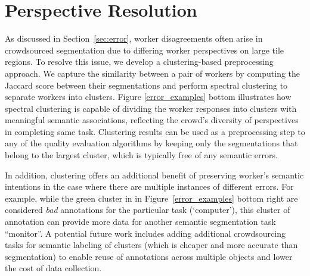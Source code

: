 \vspace{-10pt}
\section{Perspective Resolution\label{perspective}}
As discussed in Section~\ref{sec:error}, worker disagreements often arise in crowdsourced segmentation due to differing worker perspectives on large tile regions. To resolve this issue, we develop a clustering-based preprocessing approach.
We capture the similarity between a pair of workers by computing the Jaccard score between their segmentations and perform spectral clustering to separate workers into clusters. Figure \ref{error_examples} bottom illustrates how spectral clustering is capable of dividing the worker responses into clusters with meaningful semantic associations, reflecting the crowd's diversity of perspectives in completing same task. Clustering results can be used as a preprocessing step to any of the quality evaluation algorithms by keeping only the segmentations that belong to the largest cluster, which is typically free of any semantic errors.
\par In addition, clustering offers an additional benefit of preserving worker's semantic intentions in the case where there are multiple instances of different errors. For example, while the green cluster in in Figure~\ref{error_examples} bottom right are considered \textit{bad} annotations for the particular task (`computer'), this cluster of annotation can provide more data for another semantic segmentation task ``monitor''. A potential future work includes adding additional crowdsourcing tasks for semantic labeling of clusters (which is cheaper and more accurate than segmentation) to enable reuse of annotations across multiple objects and lower the cost of data collection. 